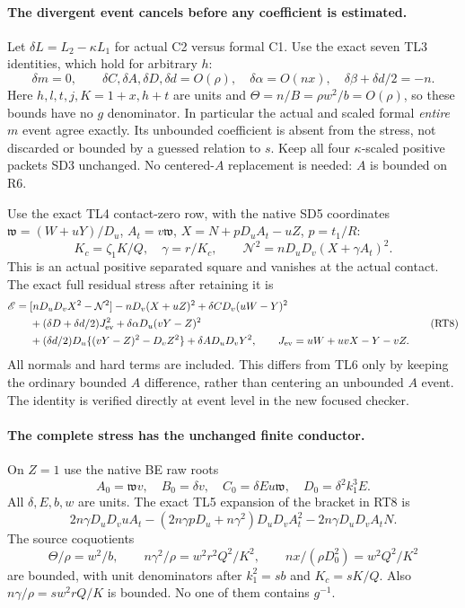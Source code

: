\paragraph{The divergent event cancels before any coefficient is estimated.}
Let $\delta L=L_2-\kappa L_1$ for actual C2 versus formal C1.
Use the exact seven TL3 identities, which hold for arbitrary $h$:
\[
 \delta m=0,\qquad \delta C,\delta A,\delta D,\delta d=O(\rho),
 \quad \delta\alpha=O(nx),\quad
 \delta\beta+\delta d/2=-n.                          \tag{RT6}
\]
Here $h,l,t,j,K=1+x,h+t$ are units and
$\Theta=n/B=\rho w^2/b=O(\rho)$, so these bounds have no $g$
denominator. In particular the actual and scaled formal \emph{entire}
$m$ event agree exactly. Its unbounded coefficient is absent from the
stress, not discarded or bounded by a guessed relation to $s$.
Keep all four $\kappa$-scaled positive packets SD3 unchanged.
No centered-$A$ replacement is needed: $A$ is bounded on R6.

Use the exact TL4 contact-zero row, with the native SD5 coordinates
$\mathfrak w=(W+uY)/D_u$, $A_t=v\mathfrak w$,
$X=N+pD_uA_t-uZ$, $p=t_1/R$:
\[
 K_c=\zeta_1K/Q,\quad\gamma=r/K_c,\qquad
 \mathcal N^2=nD_uD_v(X+\gamma A_t)^2.                \tag{RT7}
\]
This is an actual positive separated square and vanishes at the actual
contact. The exact full residual stress after retaining it is
\[
\begin{split}
 \mathscr E={}&[nD_uD_vX^2-\mathcal N^2]
   -nD_v(X+uZ)^2+\delta C D_v(uW-Y)^2\\
 &+(\delta D+\delta d/2)J_{\rm ev}^2
   +\delta\alpha D_u(vY-Z)^2\\
 &+(\delta d/2)D_u\{(vY-Z)^2-D_vZ^2\}
   +\delta A D_uD_vY^2,\qquad
 J_{\rm ev}=uW+uvX-Y-vZ.
\end{split} \tag{RT8}
\]
All normals and hard terms are included. This differs from TL6 only
by keeping the ordinary bounded $A$ difference, rather than centering
an unbounded $A$ event. The identity is verified directly at event
level in the new focused checker.

\paragraph{The complete stress has the unchanged finite conductor.}
On $Z=1$ use the native BE raw roots
\[
 A_0=\mathfrak wv,\quad B_0=\delta v,\quad
 C_0=\delta E u\mathfrak w,\quad D_0=\delta^2 k_1^3E.
\]
All $\delta,E,b,w$ are units. The exact TL5 expansion of the bracket in RT8 is
\[
 2n\gamma D_uD_vuA_t
 -(2n\gamma pD_u+n\gamma^2)D_uD_v A_t^2
 -2n\gamma D_uD_v A_tN.                             \tag{RT9}
\]
The source coquotients
\[
 \Theta/\rho=w^2/b,\qquad
 n\gamma^2/\rho=w^2r^2Q^2/K^2,\qquad
 nx/(\rho D_0^2)=w^2Q^2/K^2
\]
are bounded, with unit denominators after $k_1^2=sb$ and $K_c=sK/Q$.
Also $n\gamma/\rho=sw^2rQ/K$ is bounded. No one of them contains $g^{-1}$.

